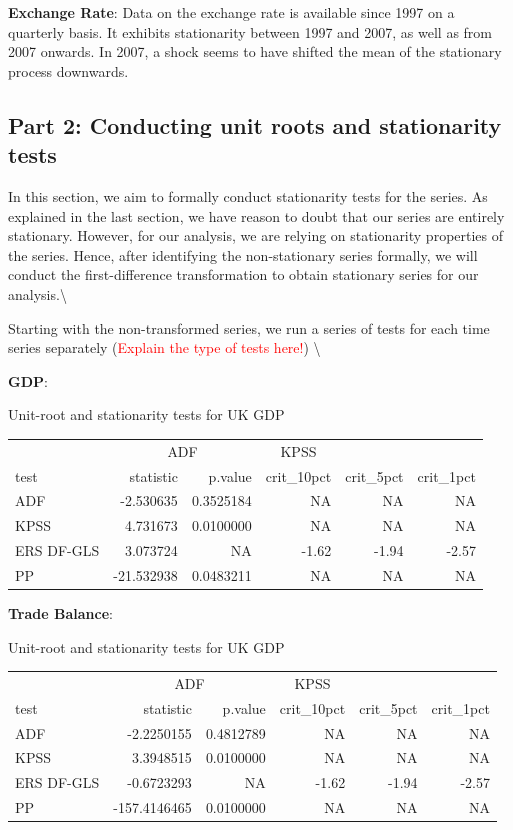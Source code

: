 \documentclass[
]{article}
\begin{document}
\textbf{Exchange Rate}: Data on the exchange rate is available since
1997 on a quarterly basis. It exhibits stationarity between 1997 and
2007, as well as from 2007 onwards. In 2007, a shock seems to have
shifted the mean of the stationary process downwards.

\subsection*{Part 2: Conducting unit roots and stationarity tests}

In this section, we aim to formally conduct stationarity tests for the
series. As explained in the last section, we have reason to doubt that
our series are entirely stationary. However, for our analysis, we are
relying on stationarity properties of the series. Hence, after
identifying the non-stationary series formally, we will conduct the
first-difference transformation to obtain stationary series for our
analysis.\textbackslash{}

Starting with the non-transformed series, we run a series of tests for
each time series separately
(\textcolor{red}{Explain the type of tests here!}) \textbackslash{}

\textbf{GDP}:

\bgroup \table[H]
\centering
\caption{\label{tab:unnamed-chunk-2}Unit-root and stationarity tests for UK GDP}
\centering
\begin{tabular}[t]{lrrrrr}
\toprule
\multicolumn{1}{c}{ } & \multicolumn{2}{c}{ADF} & \multicolumn{1}{c}{KPSS} \\
\cmidrule(l{3pt}r{3pt}){2-3} \cmidrule(l{3pt}r{3pt}){4-4}
test & statistic & p.value & crit\_10pct & crit\_5pct & crit\_1pct\\
\midrule
ADF & -2.530635 & 0.3525184 & NA & NA & NA\\
KPSS & 4.731673 & 0.0100000 & NA & NA & NA\\
ERS DF-GLS & 3.073724 & NA & -1.62 & -1.94 & -2.57\\
PP & -21.532938 & 0.0483211 & NA & NA & NA\\
\bottomrule
\end{tabular}
\endtable\egroup

\textbf{Trade Balance}:

\bgroup \table[H]
\centering
\caption{\label{tab:unnamed-chunk-3}Unit-root and stationarity tests for UK GDP}
\centering
\begin{tabular}[t]{lrrrrr}
\toprule
\multicolumn{1}{c}{ } & \multicolumn{2}{c}{ADF} & \multicolumn{1}{c}{KPSS} \\
\cmidrule(l{3pt}r{3pt}){2-3} \cmidrule(l{3pt}r{3pt}){4-4}
test & statistic & p.value & crit\_10pct & crit\_5pct & crit\_1pct\\
\midrule
ADF & -2.2250155 & 0.4812789 & NA & NA & NA\\
KPSS & 3.3948515 & 0.0100000 & NA & NA & NA\\
ERS DF-GLS & -0.6723293 & NA & -1.62 & -1.94 & -2.57\\
PP & -157.4146465 & 0.0100000 & NA & NA & NA\\
\bottomrule
\end{tabular}
\endtable\egroup
\end{document}

